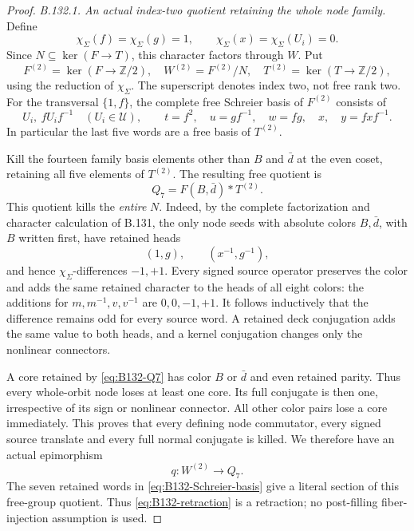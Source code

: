 \begin{proof}
\emph{B.132.1. An actual index-two quotient retaining the whole node family.}
Define
\[
 \chi_\Sigma(f)=\chi_\Sigma(g)=1,\qquad
 \chi_\Sigma(x)=\chi_\Sigma(U_i)=0.
\]
Since \(N\subseteq\ker(F\to T)\), this character factors through
\(W\). Put
\[
 F^{(2)}=\ker(F\to\mathbb Z/2),\quad
 W^{(2)}=F^{(2)}/N,\quad
 T^{(2)}=\ker(T\to\mathbb Z/2),
\]
using the reduction of \(\chi_\Sigma\). The superscript denotes
index two, not free rank two.
For the transversal \(\{1,f\}\), the complete free Schreier basis of
\(F^{(2)}\) consists of
\begin{equation}\label{eq:B132-Schreier-basis}
 U_i,\ fU_if^{-1}\quad(U_i\in\mathcal U),\qquad
 t=f^2,\quad u=gf^{-1},\quad w=fg,\quad x,\quad y=fxf^{-1}.
\end{equation}
In particular the last five words are a free basis of \(T^{(2)}\).

Kill the fourteen family basis elements other than \(B\) and
\(\bar d\) at the even coset, retaining all five elements of
\(T^{(2)}\). The resulting free quotient is
\begin{equation}\label{eq:B132-Q7}
 Q_7=F(B,\bar d)*T^{(2)}.
\end{equation}
This quotient kills the \emph{entire} \(N\). Indeed, by the complete
factorization and character calculation of B.131, the only node seeds
with absolute colors \(B,\bar d\), with \(B\) written first, have
retained heads
\[
 (1,g),\qquad (x^{-1},g^{-1}),
\]
and hence \(\chi_\Sigma\)-differences \(-1,+1\). Every signed source
operator preserves the color and adds the same retained character
to the heads of all eight colors: the additions for
\(m,m^{-1},v,v^{-1}\) are \(0,0,-1,+1\). It follows inductively
that the difference remains odd for every source word. A retained
deck conjugation adds the same value to both heads, and a kernel
conjugation changes only the nonlinear connectors.

A core retained by \eqref{eq:B132-Q7} has color \(B\) or \(\bar d\)
and even retained parity. Thus every whole-orbit node loses at least
one core. Its full conjugate is then one, irrespective of its sign
or nonlinear connector. All other color pairs lose a core
immediately. This proves that every defining node commutator, every
signed source translate and every full normal conjugate is killed.
We therefore have an actual epimorphism
\begin{equation}\label{eq:B132-retraction}
 q:W^{(2)}\longrightarrow Q_7.
\end{equation}
The seven retained words in \eqref{eq:B132-Schreier-basis} give a
literal section of this free-group quotient. Thus \eqref{eq:B132-retraction}
is a retraction; no post-filling fiber-injection assumption is used.


\end{proof}
